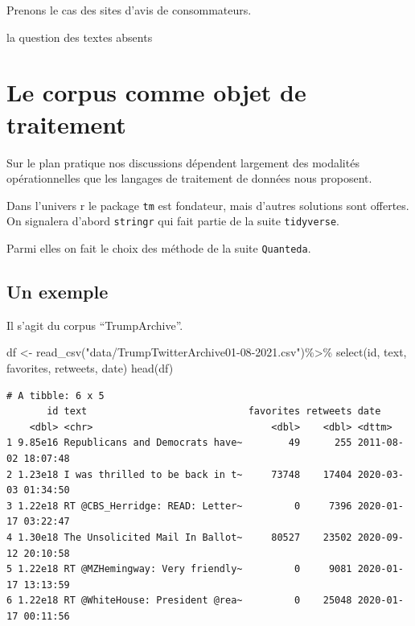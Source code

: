 \documentclass[
  letterpaper,
  DIV=11,
  numbers=noendperiod]{scrreprt}
\newenvironment{Shaded}{\begin{snugshade}}{\end{snugshade}}
\newcommand{\FunctionTok}[1]{\textcolor[rgb]{0.28,0.35,0.67}{#1}}
\newcommand{\NormalTok}[1]{\textcolor[rgb]{0.00,0.23,0.31}{#1}}
\newcommand{\OtherTok}[1]{\textcolor[rgb]{0.00,0.23,0.31}{#1}}
\newcommand{\SpecialCharTok}[1]{\textcolor[rgb]{0.37,0.37,0.37}{#1}}
\newcommand{\StringTok}[1]{\textcolor[rgb]{0.13,0.47,0.30}{#1}}
\begin{document}
Prenons le cas des sites d'avis de consommateurs.

la question des textes absents

\section{Le corpus comme objet de
traitement}\label{le-corpus-comme-objet-de-traitement}

Sur le plan pratique nos discussions dépendent largement des modalités
opérationnelles que les langages de traitement de données nous
proposent.

Dans l'univers r le package \texttt{tm} est fondateur, mais d'autres
solutions sont offertes. On signalera d'abord \texttt{stringr} qui fait
partie de la suite \texttt{tidyverse}.

Parmi elles on fait le choix des méthode de la suite \texttt{Quanteda}.

\subsection{Un exemple}\label{un-exemple}

Il s'agit du corpus ``TrumpArchive''.

\begin{Shaded}
\begin{Highlighting}[]
\NormalTok{df }\OtherTok{\textless{}{-}} \FunctionTok{read\_csv}\NormalTok{(}\StringTok{"data/TrumpTwitterArchive01{-}08{-}2021.csv"}\NormalTok{)}\SpecialCharTok{\%\textgreater{}\%}
  \FunctionTok{select}\NormalTok{(id, text, favorites, retweets, date)}
\FunctionTok{head}\NormalTok{(df)}
\end{Highlighting}
\end{Shaded}

\begin{verbatim}
# A tibble: 6 x 5
       id text                            favorites retweets date               
    <dbl> <chr>                               <dbl>    <dbl> <dttm>             
1 9.85e16 Republicans and Democrats have~        49      255 2011-08-02 18:07:48
2 1.23e18 I was thrilled to be back in t~     73748    17404 2020-03-03 01:34:50
3 1.22e18 RT @CBS_Herridge: READ: Letter~         0     7396 2020-01-17 03:22:47
4 1.30e18 The Unsolicited Mail In Ballot~     80527    23502 2020-09-12 20:10:58
5 1.22e18 RT @MZHemingway: Very friendly~         0     9081 2020-01-17 13:13:59
6 1.22e18 RT @WhiteHouse: President @rea~         0    25048 2020-01-17 00:11:56
\end{verbatim}
\end{document}

